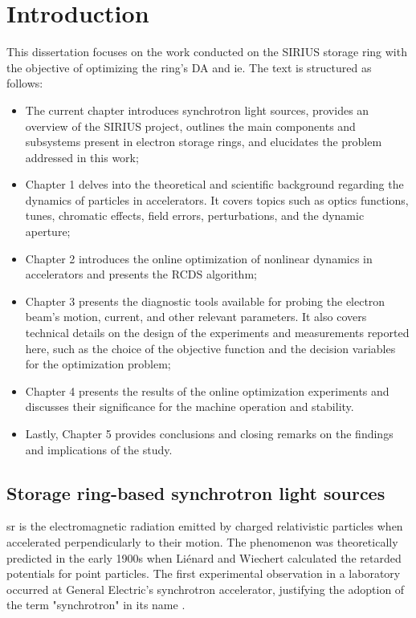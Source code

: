 \chapter*{Introduction}
This dissertation focuses on the work conducted on the SIRIUS storage ring with the objective of optimizing the ring's \gls*{DA} and \gls*{ie}. The text is structured as follows:
\begin{itemize}
    \item The current chapter introduces synchrotron light sources, provides an overview of the SIRIUS project, outlines the main components and subsystems present in electron storage rings, and elucidates the problem addressed in this work;
    \item Chapter 1 delves into the theoretical and scientific background regarding the dynamics of particles in accelerators. It covers topics such as optics functions, tunes, chromatic effects, field errors, perturbations, and the dynamic aperture;
    \item Chapter 2 introduces the online optimization of nonlinear dynamics in accelerators and presents the \gls*{RCDS} algorithm;
    \item Chapter 3 presents the diagnostic tools available for probing the electron beam's motion, current, and other relevant parameters. It also covers technical details on the design of the experiments and measurements reported here, such as the choice of the objective function and the decision variables for the optimization problem;
    \item Chapter 4 presents the results of the online optimization experiments and discusses their significance for the machine operation and stability.
    \item Lastly, Chapter 5 provides conclusions and closing remarks on the findings and implications of the study.
\end{itemize}

\section*{Storage ring-based synchrotron light sources}

\gls*{sr} is the electromagnetic radiation emitted by charged relativistic particles when accelerated perpendicularly to their motion. The phenomenon was theoretically predicted in the early 1900s when Liénard and Wiechert calculated the retarded potentials for point particles. The first experimental observation in a laboratory occurred at General Electric's synchrotron accelerator, justifying the adoption of the term "synchrotron" in its name \cite{wiedemann_particle_2015}.

